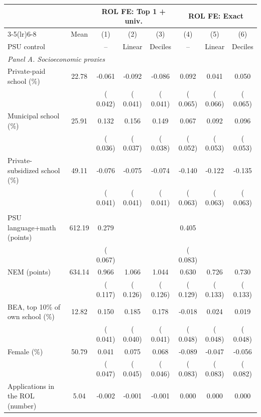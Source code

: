 \begin{tabular}{lccccccc}
\toprule
 & & \multicolumn{3}{c}{ROL FE: Top 1 + univ.} & \multicolumn{3}{c}{ROL FE: Exact} \\
\cmidrule(lr){3-5}\cmidrule(lr){6-8}
 & Mean & (1) & (2) & (3) & (4) & (5) & (6) \\
PSU control & & -- & Linear & Deciles & -- & Linear & Deciles \\
\midrule
\multicolumn{8}{l}{\textit{Panel A. Socioeconomic proxies}} \\
Private-paid school (\%) &  22.78 &  -0.061 &  -0.092\sym{**} &  -0.086\sym{**} &   0.092 &   0.041 &   0.050 \\
 & & ( 0.042) & ( 0.041) & ( 0.041) & ( 0.065) & ( 0.066) & ( 0.065) \\
Municipal school (\%) &  25.91 &   0.132\sym{***} &   0.156\sym{***} &   0.149\sym{***} &   0.067 &   0.092\sym{*} &   0.096\sym{*} \\
 & & ( 0.036) & ( 0.037) & ( 0.038) & ( 0.052) & ( 0.053) & ( 0.053) \\
Private-subsidized school (\%) &  49.11 &  -0.076\sym{*} &  -0.075\sym{*} &  -0.074\sym{*} &  -0.140\sym{**} &  -0.122\sym{*} &  -0.135\sym{**} \\
 & & ( 0.041) & ( 0.041) & ( 0.041) & ( 0.063) & ( 0.063) & ( 0.063) \\
\addlinespace
\multicolumn{8}{l}{\textit{Panel B. Achievement and other predetermined}} \\
PSU language+math (points) & 612.19 &   0.279\sym{***} &  &  &   0.405\sym{***} &  &  \\
 & & ( 0.067) &  &  & ( 0.083) &  &  \\
NEM (points) & 634.14 &   0.966\sym{***} &   1.066\sym{***} &   1.044\sym{***} &   0.630\sym{***} &   0.726\sym{***} &   0.730\sym{***} \\
 & & ( 0.117) & ( 0.126) & ( 0.126) & ( 0.129) & ( 0.133) & ( 0.133) \\
BEA, top 10\% of own school (\%) &  12.82 &   0.150\sym{***} &   0.185\sym{***} &   0.178\sym{***} &  -0.018 &   0.024 &   0.019 \\
 & & ( 0.041) & ( 0.040) & ( 0.041) & ( 0.048) & ( 0.048) & ( 0.048) \\
Female (\%) &  50.79 &   0.041 &   0.075\sym{*} &   0.068 &  -0.089 &  -0.047 &  -0.056 \\
 & & ( 0.047) & ( 0.045) & ( 0.046) & ( 0.083) & ( 0.083) & ( 0.082) \\
Applications in the ROL (number) &   5.04 &  -0.002 &  -0.001 &  -0.001 &   0.000 &   0.000 &   0.000 \\

\end{tabular}
